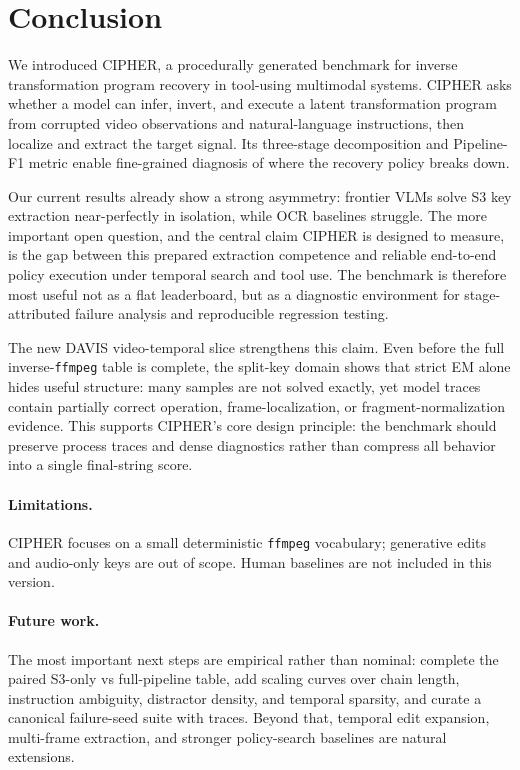 \section{Conclusion}
\label{sec:conclusion}

We introduced CIPHER, a procedurally generated benchmark for inverse
transformation program recovery in tool-using multimodal systems. CIPHER asks
whether a model can infer, invert, and execute a latent transformation program
from corrupted video observations and natural-language instructions, then
localize and extract the target signal. Its three-stage decomposition and
Pipeline-F1 metric enable fine-grained diagnosis of where the recovery policy
breaks down.

Our current results already show a strong asymmetry: frontier VLMs solve S3 key
extraction near-perfectly in isolation, while OCR baselines struggle. The more
important open question, and the central claim CIPHER is designed to measure,
is the gap between this prepared extraction competence and reliable end-to-end
policy execution under temporal search and tool use. The benchmark is therefore
most useful not as a flat leaderboard, but as a diagnostic environment for
stage-attributed failure analysis and reproducible regression testing.

The new DAVIS video-temporal slice strengthens this claim. Even before the full
inverse-\texttt{ffmpeg} table is complete, the split-key domain shows that
strict EM alone hides useful structure: many samples are not solved exactly,
yet model traces contain partially correct operation, frame-localization, or
fragment-normalization evidence. This supports CIPHER's core design principle:
the benchmark should preserve process traces and dense diagnostics rather than
compress all behavior into a single final-string score.

\paragraph{Limitations.}
CIPHER focuses on a small deterministic \texttt{ffmpeg} vocabulary; generative
edits and audio-only keys are out of scope. Human baselines are not included in
this version.

\paragraph{Future work.}
The most important next steps are empirical rather than nominal: complete the
paired S3-only vs full-pipeline table, add scaling curves over chain length,
instruction ambiguity, distractor density, and temporal sparsity, and curate a
canonical failure-seed suite with traces. Beyond that, temporal edit expansion,
multi-frame extraction, and stronger policy-search baselines are natural
extensions.


